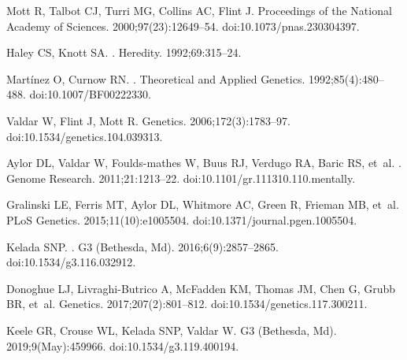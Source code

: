 \documentclass[10pt,letterpaper]{article}
\begin{document}
\begin{thebibliography}{10}
Mott R, Talbot CJ, Turri MG, Collins AC, Flint J.
\newblock Proceedings of the National Academy of Sciences.
  2000;97(23):12649--54.
\newblock doi:{10.1073/pnas.230304397}.

Haley CS, Knott SA.
.
\newblock Heredity. 1992;69:315--24.

Mart{\'{i}}nez O, Curnow RN.
.
\newblock Theoretical and Applied Genetics. 1992;85(4):480--488.
\newblock doi:{10.1007/BF00222330}.

Valdar W, Flint J, Mott R.
\newblock Genetics. 2006;172(3):1783--97.
\newblock doi:{10.1534/genetics.104.039313}.

Aylor DL, Valdar W, Foulds-mathes W, Buus RJ, Verdugo RA, Baric RS, et~al.
.
\newblock Genome Research. 2011;21:1213--22.
\newblock doi:{10.1101/gr.111310.110.mentally}.

Gralinski LE, Ferris MT, Aylor DL, Whitmore AC, Green R, Frieman MB, et~al.
\newblock PLoS Genetics. 2015;11(10):e1005504.
\newblock doi:{10.1371/journal.pgen.1005504}.

Kelada SNP.
.
\newblock G3 (Bethesda, Md). 2016;6(9):2857--2865.
\newblock doi:{10.1534/g3.116.032912}.

Donoghue LJ, Livraghi-Butrico A, McFadden KM, Thomas JM, Chen G, Grubb BR,
  et~al.
\newblock Genetics. 2017;207(2):801--812.
\newblock doi:{10.1534/genetics.117.300211}.

Keele GR, Crouse WL, Kelada SNP, Valdar W.
\newblock G3 (Bethesda, Md). 2019;9(May):459966.
\newblock doi:{10.1534/g3.119.400194}.


\end{thebibliography}
\end{document}
